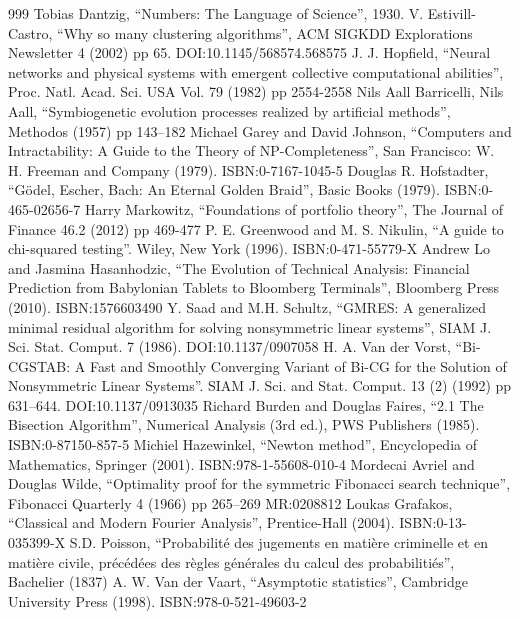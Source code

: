 \documentclass[justified, sixbynine]{tufte-book}
\theoremstyle{plain}%
\newtheorem * {corollary}{Corollary}
\theoremstyle{definition}
\theoremstyle{remark}
\newtheorem * {remark}{Remark}
\newtheorem * {note}{Note}
\begin{document}
\begin{thebibliography}{999}
 Tobias Dantzig, ``Numbers: The Language of Science'', 1930.
 V. Estivill-Castro, ``Why so many clustering algorithms'', ACM SIGKDD Explorations Newsletter 4 (2002) pp 65. DOI:10.1145/568574.568575
 J. J. Hopfield, ``Neural networks and physical systems with emergent collective computational abilities'', Proc. Natl. Acad. Sci. USA Vol. 79 (1982) pp 2554-2558
 Nils Aall Barricelli, Nils Aall, ``Symbiogenetic evolution processes realized by artificial methods'', Methodos (1957) pp 143–182
 Michael Garey and David Johnson, ``Computers and Intractability: A Guide to the Theory of NP-Completeness'', San Francisco: W. H. Freeman and Company (1979). ISBN:0-7167-1045-5
 Douglas R. Hofstadter, ``Gödel, Escher, Bach: An Eternal Golden Braid'', Basic Books (1979). ISBN:0-465-02656-7
 Harry Markowitz, ``Foundations of portfolio theory'', The Journal of Finance 46.2 (2012) pp 469-477
 P. E. Greenwood and M. S. Nikulin, ``A guide to chi-squared testing''. Wiley, New York (1996). ISBN:0-471-55779-X
 Andrew Lo and Jasmina Hasanhodzic, ``The Evolution of Technical Analysis: Financial Prediction from Babylonian Tablets to Bloomberg Terminals'', Bloomberg Press (2010). ISBN:1576603490
 Y. Saad and M.H. Schultz, ``GMRES: A generalized minimal residual algorithm for solving nonsymmetric linear systems'', SIAM J. Sci. Stat. Comput. 7 (1986). DOI:10.1137/0907058
 H. A. Van der Vorst, ``Bi-CGSTAB: A Fast and Smoothly Converging Variant of Bi-CG for the Solution of Nonsymmetric Linear Systems''. SIAM J. Sci. and Stat. Comput. 13 (2) (1992) pp 631–644. DOI:10.1137/0913035
 Richard Burden and Douglas Faires, ``2.1 The Bisection Algorithm'', Numerical Analysis (3rd ed.), PWS Publishers (1985). ISBN:0-87150-857-5
 Michiel Hazewinkel, ``Newton method'', Encyclopedia of Mathematics, Springer (2001). ISBN:978-1-55608-010-4
 Mordecai Avriel and Douglas Wilde, ``Optimality proof for the symmetric Fibonacci search technique'', Fibonacci Quarterly 4 (1966) pp 265–269 MR:0208812
 Loukas Grafakos, ``Classical and Modern Fourier Analysis'', Prentice-Hall (2004). ISBN:0-13-035399-X
 S.D. Poisson, ``Probabilité des jugements en matière criminelle et en matière civile, précédées des règles générales du calcul des probabilitiés'', Bachelier (1837)
 A. W. Van der Vaart, ``Asymptotic statistics'', Cambridge University Press (1998). ISBN:978-0-521-49603-2

\end{thebibliography}
\end{document}
